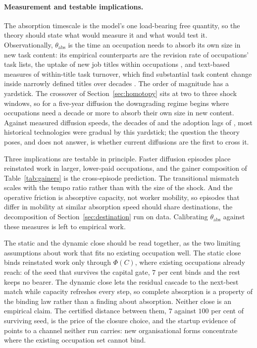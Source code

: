 \documentclass[12pt, a4paper]{article}
\begin{document}
\paragraph{Measurement and testable implications.}
The absorption timescale is the model's one load-bearing free quantity,
so the theory should state what would measure it and what would test
it. Observationally, $\theta_{\text{abs}}$ is the time an occupation
needs to absorb its own size in new task content: its empirical
counterparts are the revision rate of occupations' task lists, the
uptake of new job titles within occupations
\parencite{lin2011adaptation, autor2024newwork}, and text-based
measures of within-title task turnover, which find substantial task
content change inside narrowly defined titles over decades
\parencite{atalay2020evolution}. The order of magnitude has a
yardstick. The crossover of Section~\ref{sec:homotopy} sits at two to
three shock windows, so for a five-year diffusion the downgrading
regime begins where occupations need a decade or more to absorb their
own size in new content. Against measured diffusion speeds, the
decades of \textcite{david1990dynamo} and the adoption lags of
\textcite{comin2010exploration}, most historical technologies were
gradual by this yardstick; the question the theory poses, and does not
answer, is whether current diffusions are the first to cross it.

Three implications are testable in principle. Faster diffusion episodes
place reinstated work in larger, lower-paid occupations, and the gainer
composition of Table~\ref{tab:gainers} is the cross-episode prediction.
The transitional mismatch scales with the tempo ratio rather than with
the size of the shock. And the operative friction is absorptive
capacity, not worker mobility, so episodes that differ in mobility at
similar absorption speed should share destinations, the decomposition
of Section~\ref{sec:destination} run on data. Calibrating
$\theta_{\text{abs}}$ against these measures is left to empirical work.

The static and the dynamic close should be read together, as the two
limiting assumptions about work that fits no existing occupation well.
The static close binds reinstated work only through $\Phi(C)$, where
existing occupations already reach: of the seed that survives the
capital gate, $7$ per cent binds and the rest keeps no bearer. The
dynamic close lets the residual cascade to the next-best match while
capacity refreshes every step, so complete absorption is a property of
the binding law rather than a finding about absorption. Neither close
is an empirical claim. The certified distance between them, $7$
against $100$ per cent of surviving seed, is the price of the closure
choice, and the startup evidence of \textcite{storck2026fields} points
to a channel neither run carries: new organisational forms concentrate
where the existing occupation set cannot bind.
\end{document}

